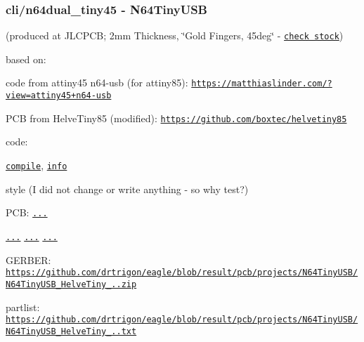 \subsubsection*{cli/n64dual\-\_\-tiny45 -\/ N64\-Tiny\-U\-S\-B}

(produced at J\-L\-C\-P\-C\-B; 2mm Thickness, \char`\"{}\-Gold Fingers, 45deg\char`\"{} -\/ \href{https://www.tindie.com/products/13107/}{\tt check stock})

based on\-:
\begin{DoxyItemize}
\item code from attiny45 n64-\/usb (for attiny85)\-: \href{https://matthiaslinder.com/?view=attiny45+n64-usb}{\tt https\-://matthiaslinder.\-com/?view=attiny45+n64-\/usb}
\item P\-C\-B from Helve\-Tiny85 (modified)\-: \href{https://github.com/boxtec/helvetiny85}{\tt https\-://github.\-com/boxtec/helvetiny85}
\end{DoxyItemize}

code\-:
\begin{DoxyItemize}
\item \href{https://github.com/drtrigon/sketchbook/blob/result/docu/cli/n64dual_tiny45/main.hex.compile}{\tt compile}, \href{https://github.com/drtrigon/sketchbook/blob/result/docu/cli/n64dual_tiny45/main.hex.info}{\tt info}
\item style (I did not change or write anything -\/ so why test?)
\end{DoxyItemize}

P\-C\-B\-:  \href{https://github.com/drtrigon/eagle/blob/result/pcb/projects/N64TinyUSB/N64TinyUSB_HelveTiny_1.0_sch.png}{\tt ...}

 \href{https://edrc.me/g/drtrigon/eagle}{\tt ...}  \href{https://github.com/drtrigon/eagle/blob/result/pcb/projects/N64TinyUSB/N64TinyUSB_HelveTiny_1.0_brd.png}{\tt ...}  \href{https://github.com/drtrigon/eagle/blob/result/pcb/projects/N64TinyUSB/N64TinyUSB_HelveTiny_1.0.png}{\tt ...}
\begin{DoxyItemize}
\item G\-E\-R\-B\-E\-R\-: \href{https://github.com/drtrigon/eagle/blob/result/pcb/projects/N64TinyUSB/N64TinyUSB_HelveTiny_1.0.zip}{\tt https\-://github.\-com/drtrigon/eagle/blob/result/pcb/projects/\-N64\-Tiny\-U\-S\-B/\-N64\-Tiny\-U\-S\-B\-\_\-\-Helve\-Tiny\-\_..\-zip}
\item partlist\-: \href{https://github.com/drtrigon/eagle/blob/result/pcb/projects/N64TinyUSB/N64TinyUSB_HelveTiny_1.0.txt}{\tt https\-://github.\-com/drtrigon/eagle/blob/result/pcb/projects/\-N64\-Tiny\-U\-S\-B/\-N64\-Tiny\-U\-S\-B\-\_\-\-Helve\-Tiny\-\_..\-txt}
\end{DoxyItemize}

